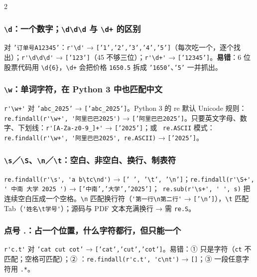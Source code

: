 \begin{multicols}{2}\raggedcolumns\sloppy
\subsubsection{\texorpdfstring{\texttt{\textbackslash d}：一个数字；\texttt{\textbackslash d\textbackslash d\textbackslash d} 与 \texttt{\textbackslash d+} 的区别}{\textbackslash d、\textbackslash d\textbackslash d\textbackslash d 与 \textbackslash d+ 的区别}}
对 \texttt{'订单号A12345'}：\lstinline|r'\d'| → \texttt{['1','2','3','4','5']}（每次吃一个，逐个找出）；\lstinline|r'\d\d\d'| → \texttt{['123']}（45 不够三位）；\lstinline|r'\d+'| → \texttt{['12345']}。\textbf{易错}：6 位股票代码用 \texttt{\textbackslash d\{6\}}，\texttt{\textbackslash d+} 会把价格 \texttt{1650.5} 拆成 \texttt{'1650'}、\texttt{'5'} 一并抓出。

\subsubsection{\texorpdfstring{\texttt{\textbackslash w}：单词字符，在 Python 3 中也匹配中文}{\textbackslash w：单词字符，也匹配中文}}
\lstinline|r'\w+'| 对 \texttt{'abc\_2025'} → \texttt{['abc\_2025']}。Python 3 的 re 默认 Unicode 规则：\lstinline|re.findall(r'\w+', '阿里巴巴2025')| → \texttt{['阿里巴巴2025']}。只要英文字母、数字、下划线：\lstinline|r'[A-Za-z0-9_]+'| → \texttt{['2025']}；或 \tagext\ \texttt{re.ASCII} 模式：\lstinline|re.findall(r'\w+', '阿里巴巴2025', re.ASCII)| → \texttt{['2025']}。

\subsubsection{\texorpdfstring{\texttt{\textbackslash s}／\texttt{\textbackslash S}、\texttt{\textbackslash n}／\texttt{\textbackslash t}：空白、非空白、换行、制表符}{\textbackslash s、\textbackslash S、\textbackslash n、\textbackslash t：空白、非空白、换行、制表符}}
\lstinline|re.findall(r'\s', 'a b\tc\nd')| → \texttt{[' ', '\textbackslash t', '\textbackslash n']}；\lstinline|re.findall(r'\S+', ' 中南 大学 2025 ')| → \texttt{['中南','大学','2025']}；\tagext\ \lstinline|re.sub(r'\s+', ' ', s)| 把连续空白压成一个空格。\texttt{\textbackslash n} 匹配换行符（\lstinline|'第一行\n第二行'| → \texttt{['\textbackslash n']}），\texttt{\textbackslash t} 匹配 Tab（\lstinline|'姓名\t学号'|）；源码与 PDF 文本充满换行 → 需 \texttt{re.S}。

\subsubsection{点号 .：占一个位置，什么字符都行，但只能一个}
\lstinline|r'c.t'| 对 \texttt{'cat cut cot'} → \texttt{['cat','cut','cot']}。易错：① 只是字符（\texttt{ct} 不匹配；空格可匹配）；② ：\lstinline|re.findall(r'c.t', 'c\nt')| → \texttt{[]}；③ 一段任意字符用 \texttt{.*}。


\end{multicols}
